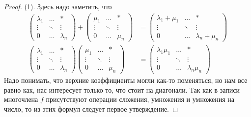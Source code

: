 \begin{proof}
(1). Здесь надо заметить, что 
\begin{align*}
\begin{pmatrix}
{\lambda_1}&{\ldots}&{*}\\
{\vdots}&{\ddots}&{\vdots}\\
{0}&{\ldots}&{\lambda_n}
\end{pmatrix}
+
\begin{pmatrix}
{\mu_1}&{\ldots}&{*}\\
{\vdots}&{\ddots}&{\vdots}\\
{0}&{\ldots}&{\mu_n}
\end{pmatrix}
&=
\begin{pmatrix}
{\lambda_1+\mu_1}&{\ldots}&{*}\\
{\vdots}&{\ddots}&{\vdots}\\
{0}&{\ldots}&{\lambda_n+\mu_n}
\end{pmatrix}\\
\begin{pmatrix}
{\lambda_1}&{\ldots}&{*}\\
{\vdots}&{\ddots}&{\vdots}\\
{0}&{\ldots}&{\lambda_n}
\end{pmatrix}
\begin{pmatrix}
{\mu_1}&{\ldots}&{*}\\
{\vdots}&{\ddots}&{\vdots}\\
{0}&{\ldots}&{\mu_n}
\end{pmatrix}
&=
\begin{pmatrix}
{\lambda_1\mu_1}&{\ldots}&{*}\\
{\vdots}&{\ddots}&{\vdots}\\
{0}&{\ldots}&{\lambda_n\mu_n}
\end{pmatrix}
\end{align*}
Надо понимать, что верхние коэффициенты могли как-то поменяться, но нам все равно как, нас интересует только то, что стоит на диагонали. Так как в записи многочлена $f$ присутствуют операции сложения, умножения и умножения на число, то из этих формул следует первое утверждение.


\end{proof}
